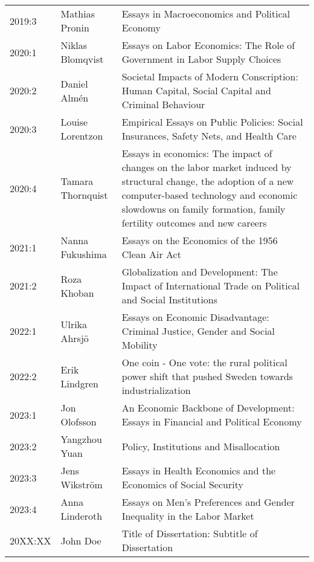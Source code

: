 {\begin{longtable}{p{} p{} p{}}
    2019:3 & Mathias Pronin & Essays in Macroeconomics and Political Economy \\
    2020:1 & Niklas Blomqvist & Essays on Labor Economics: The Role of Government in Labor Supply Choices \\
    2020:2 & Daniel Almén & Societal Impacts of Modern Conscription: Human Capital, Social Capital and Criminal Behaviour \\
    2020:3 & Louise Lorentzon & Empirical Essays on Public Policies: Social Insurances, Safety Nets, and Health Care \\
    2020:4 & Tamara Thornquist & Essays in economics: The impact of changes on the labor market induced by structural change, the adoption of a new computer-based technology and economic slowdowns on family formation, family fertility outcomes and new careers \\
    2021:1 & Nanna Fukushima & Essays on the Economics of the 1956 Clean Air Act \\
    2021:2 & Roza Khoban & Globalization and Development: The Impact of International Trade on Political and Social Institutions \\
    2022:1 & Ulrika Ahrsjö & Essays on Economic Disadvantage: Criminal Justice, Gender and Social Mobility \\
    2022:2 & Erik Lindgren & One coin - One vote: the rural political power shift that pushed Sweden towards industrialization \\
    2023:1 & Jon Olofsson & An Economic Backbone of Development: Essays in Financial and Political Economy \\
    2023:2 & Yangzhou Yuan & Policy, Institutions and Misallocation \\
    2023:3 & Jens Wikström & Essays in Health Economics and the Economics of Social Security \\
    2023:4 & Anna Linderoth & Essays on Men's Preferences and Gender Inequality in the Labor Market \\
    20XX:XX & John Doe & Title of Dissertation: Subtitle of Dissertation \\
\end{longtable}
}
